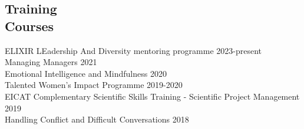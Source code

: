 \documentclass[margin,line]{res}
\begin{document}
\begin{resume}


\section{\sc Training\\ Courses}

ELIXIR LEadership And Diversity mentoring programme \hfill {2023-present}\\
Managing Managers \hfill {2021}\\
Emotional Intelligence and Mindfulness \hfill {2020}\\
Talented Women's Impact Programme \hfill {2019-2020}\\
EICAT Complementary Scientific Skills Training - Scientific Project Management \hfill {2019}\\
Handling Conflict and Difficult Conversations \hfill {2018}

\end{resume}
\end{document}

